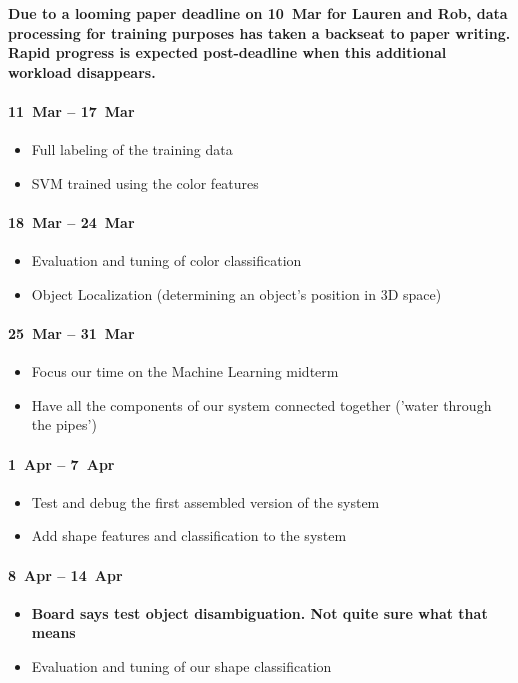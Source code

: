 \documentclass[11pt]{article}
\newcommand{\meh}[1]{{\bf \color{blue} #1}}
\begin{document}
\meh{Due to a looming paper deadline on 10~Mar for Lauren and Rob, data
    processing for training purposes has taken a backseat to paper writing.
    Rapid progress is expected post-deadline when this additional workload
    disappears.}

\paragraph{11~Mar -- 17~Mar} 
\begin{itemize}
\item Full labeling of the training data
\item SVM trained using the color features
\end{itemize}

\paragraph{18~Mar -- 24~Mar}
\begin{itemize}
\item Evaluation and tuning of color classification
\item Object Localization (determining an object's position in 3D space)
\end{itemize}

\paragraph{25~Mar -- 31~Mar}
\begin{itemize}
\item Focus our time on the Machine Learning midterm
\item Have all the components of our system connected together ('water through the pipes')
\end{itemize}

\paragraph{1~Apr -- 7~Apr}
\begin{itemize}
\item Test and debug the first assembled version of the system
\item Add shape features and classification to the system
\end{itemize}

\paragraph{8~Apr -- 14~Apr}
\begin{itemize}
\item \meh{Board says test object disambiguation. Not quite sure what that means}
\item Evaluation and tuning of our shape classification
\end{itemize}
\end{document}
